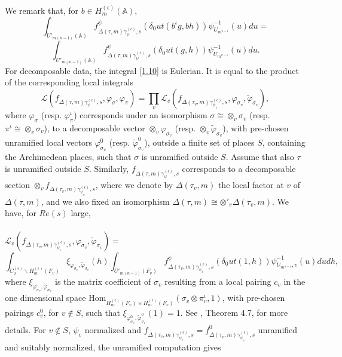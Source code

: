 \documentclass[12pts]{amsart}
\newcommand{\BA}{{\mathbb {A}}}
\newcommand{\Hom}{{\mathrm{Hom}}}
\begin{document}
	We remark that, for $b\in H^{(\epsilon)}_m(\BA)$,
$$
\int_{U'_{m(n-1)}(\BA)}
f^\psi_{\Delta(\tau, m)\gamma^{(\epsilon)}_\psi,s}(\delta_0ut(b^\iota g,bh))\psi^{-1}_{U_{m^{n-1}}}(u)du=
$$
\begin{equation}\label{1.10.6}
\int_{U'_{m(n-1)}(\BA)}
f^\psi_{\Delta(\tau, m)\gamma^{(\epsilon)}_\psi,s}(\delta_0ut(g,h))\psi^{-1}_{U_{m^{n-1}}}(u)du.
\end{equation}
For decomposable data, the integral \eqref{1.10} is Eulerian. It is equal to the product of the corresponding local integrals
$$
\mathcal{L}(f_{\Delta(\tau,m)\gamma^{(\epsilon)}_\psi,s},\varphi_\sigma, \varphi_\pi)=
\prod_v \mathcal{L}_v(f_{\Delta(\tau_v,m)\gamma^{(\epsilon)}_{\psi_v},s},\varphi_{\sigma_v}, \tilde{\varphi}_{\sigma_v}),
$$
where $\varphi_\sigma$ (resp. $\varphi^\iota_\pi$) corresponds under an isomorphism $\sigma\cong \otimes_v \sigma_v$ (resp. $\pi^\iota\cong \otimes_v\hat{\sigma}_v$), to a decomposable vector $\otimes_v \varphi_{\sigma_v}$ (resp. $\otimes_v \tilde{\varphi}_{\sigma_v}$), with pre-chosen unramified local vectors $\varphi^0_{\sigma_v}$ (resp. $\tilde{\varphi}^0_{\sigma_v}$), outside a finite set of places $S$, containing the Archimedean places, such that $\sigma$ is unramified outside $S$. Assume that also $\tau$ is unramified outside $S$. Similarly, $f_{\Delta(\tau,m)\gamma^{(\epsilon)}_\psi,s}$ corresponds to a decomposable section $\otimes_v f_{\Delta(\tau_v,m)\gamma^{(\epsilon)}_{\psi_v},s}$, where we denote by $\Delta(\tau_v,m)$ the local factor at $v$ of $\Delta(\tau,m)$, and we also fixed an isomorphism $\Delta(\tau,m)\cong \otimes'_v \Delta(\tau_v,m)$. We have, for $Re(s)$ large,\\
\\
$\mathcal{L}_v(f_{\Delta(\tau_v,m)\gamma^{(\epsilon)}_{\psi_v},s},\varphi_{\sigma_v}, \tilde{\varphi}_{\sigma_v})=$
\begin{equation}\label{1.10.7}
\int_{C_2^{(\epsilon)}\backslash H^{(\epsilon)}_m(F_v)}\xi_{\varphi_{\sigma_v},\tilde{\varphi}_{\sigma_v}}(h)\int_{U'_{m(n-1)}(F_v)}
f^\psi_{\Delta(\tau_v, m)\gamma^{(\epsilon)}_{\psi_v},s}(\delta_0ut(1,h))\psi^{-1}_{U_{m^{n-1}},v}(u)dudh,
\end{equation}
where $\xi_{\varphi_{\sigma_v},\tilde{\varphi}_{\sigma_v}}$ is the matrix coefficient of $\sigma_v$ resulting from a local pairing $c_v$ in the one dimensional space $\Hom_{H_m^{(\epsilon)}(F_v)\times H_m^{(\epsilon)}(F_v)}(\sigma_v\otimes \pi_v^\iota,1)$, with pre-chosen pairings $c_v^0$, for $v\notin S$, such that $\xi_{\varphi^0_{\sigma_v},\tilde{\varphi}^0_{\sigma_v}}(1)=1$. See \cite{GS18}, Theorem 4.7, for more details. For $v\notin S$, $\psi_v$ normalized and $f_{\Delta(\tau_v,m)\gamma^{(\epsilon)}_{\psi_v},s}=f^0_{\Delta(\tau_v,m)\gamma^{(\epsilon)}_{\psi_v},s}$ unramified and suitably normalized, the unramified computation gives
\end{document}
